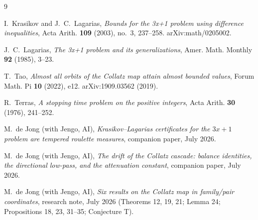 \documentclass[11pt]{article}
\theoremstyle{definition}
\theoremstyle{remark}
\begin{document}
\begin{thebibliography}{9}

I.~Krasikov and J.~C.~Lagarias,
\emph{Bounds for the 3x+1 problem using difference inequalities},
Acta Arith. \textbf{109} (2003), no.~3, 237--258. arXiv:math/0205002.

J.~C.~Lagarias,
\emph{The 3x+1 problem and its generalizations},
Amer. Math. Monthly \textbf{92} (1985), 3--23.

T.~Tao,
\emph{Almost all orbits of the Collatz map attain almost bounded values},
Forum Math. Pi \textbf{10} (2022), e12. arXiv:1909.03562 (2019).

R.~Terras,
\emph{A stopping time problem on the positive integers},
Acta Arith. \textbf{30} (1976), 241--252.

M.~de Jong (with Jengo, AI),
\emph{Krasikov--Lagarias certificates for the $3x+1$ problem are tempered
roulette measures}, companion paper, July 2026.

M.~de Jong (with Jengo, AI),
\emph{The drift of the Collatz cascade: balance identities, the directional
low-pass, and the attenuation constant}, companion paper, July 2026.

M.~de Jong (with Jengo, AI),
\emph{Six results on the Collatz map in family/pair coordinates}, research note,
July 2026 (Theorems 12, 19, 21; Lemma 24; Propositions 18, 23, 31--35;
Conjecture T).

\end{thebibliography}
\end{document}
